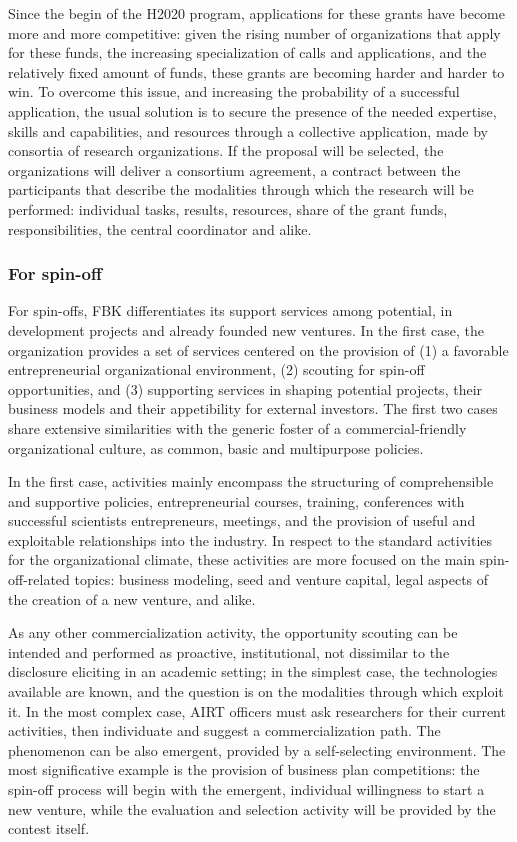 Since the begin of the H2020 program, applications for these grants have become more and more competitive: given the rising number of organizations that apply for these funds, the increasing specialization of calls and applications, and the relatively fixed amount of funds, these grants are becoming harder and harder to win. To overcome this issue, and increasing the probability of a successful application, the usual solution is to secure the presence of the needed expertise, skills and capabilities, and resources through a collective application, made by consortia of research organizations. If the proposal will be selected, the organizations will deliver a consortium agreement, a contract between the participants that describe the modalities through which the research will be performed: individual tasks, results, resources, share of the grant funds, responsibilities, the central coordinator and alike. 

\subsubsection{For spin-off}

For spin-offs, FBK differentiates its support services among potential, in development projects and already founded new ventures. In the first case, the organization provides a set of services centered on the provision of (1) a favorable entrepreneurial organizational environment, (2) scouting for spin-off opportunities, and (3) supporting services in shaping potential projects, their business models and their appetibility for external investors. The first two cases share extensive similarities with the generic foster of a commercial-friendly organizational culture, as common, basic and multipurpose policies.

In the first case, activities mainly encompass the structuring of comprehensible and supportive policies,  entrepreneurial courses, training, conferences with successful scientists entrepreneurs, meetings, and the provision of useful and exploitable relationships into the industry. In respect to the standard activities for the organizational climate, these activities are more focused on the main spin-off-related topics: business modeling, seed and venture capital, legal aspects of the creation of a new venture, and alike. 

As any other commercialization activity, the opportunity scouting can be intended and performed as proactive, institutional, not dissimilar to the disclosure eliciting in an academic setting; in the simplest case, the technologies available are known, and the question is on the modalities through which exploit it. In the most complex case, AIRT officers must ask researchers for their current activities, then individuate and suggest a commercialization path. The phenomenon can be also emergent, provided by a self-selecting environment. The most significative example is the provision of business plan competitions: the spin-off process will begin with the emergent, individual willingness to start a new venture, while the evaluation and selection activity will be provided by the contest itself.

